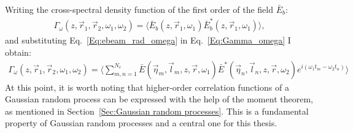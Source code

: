     Writing the cross-spectral density function of the first order of the field $\bar{E}_b$:
    \begin{align}
        \Gamma_\omega (z, \vec{r}_1, \vec{r}_2, \omega_1, \omega_2) = \langle \bar{E}_b(z, \vec{r}_1, \omega_1) \bar{E}^*_b(z, \vec{r}_1, \omega_1) \rangle,
        \label{Eq:Gamma_omega}
    \end{align} 
    and substituting Eq.~\ref{Eq:ebeam_rad_omega} in Eq.~\ref{Eq:Gamma_omega} I obtain:
    \begin{align}
        \Gamma_\omega (z, \vec{r}_1, \vec{r}_2, \omega_1, \omega_2) = \bigg\langle 
        \sum_{m,n=1}^{N_e} \bar{E}(\vec{\eta}_m, \vec{l}_m, z, \vec{r}, \omega_1)\bar{E}^*(\vec{\eta}_n, \vec{l}_n, z, \vec{r}, \omega_2)e^{i (\omega_1 t_m - \omega_2 t_n)}
        \bigg\rangle
    \end{align}
    At this point, it is worth noting that higher-order correlation functions of a Gaussian random process can be expressed with the help of the moment theorem, as mentioned in Section~\ref{Sec:Gaussian random processes}. This is a fundamental property of Gaussian random processes and a central one for this thesis.
    

